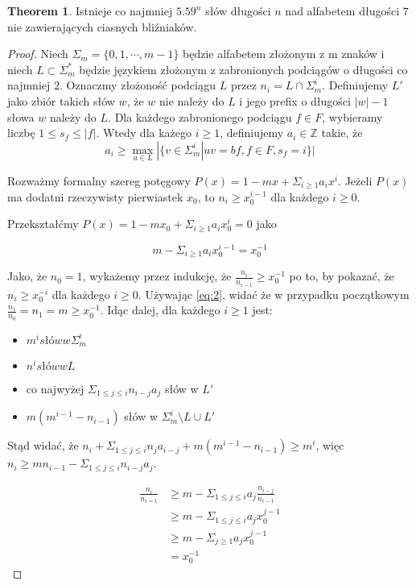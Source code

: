\documentclass[11pt,a4paper]{article}
\theoremstyle{definition}
\newtheorem{theorem}{Theorem}[section]
\begin{document}
\begin{theorem}
Istnieje co najmniej $5.59^n$ słów długości $n$ nad alfabetem długości $7$ nie zawierających ciasnych bliźniaków.
\begin{proof}
Niech $\Sigma_m=\{0,1,\cdots ,m-1\}$ będzie alfabetem złożonym z m znaków i niech $L \subset \Sigma^{*}_m$ będzie językiem złożonym z zabronionych podciągów o długości co najmniej 2. Oznaczmy złożoność podciągu $L$ przez $n_i = L \cap \Sigma^{i}_m$. Definiujemy $L'$ jako zbiór takich słów $w$, że $w$ nie należy do $L$ i jego prefix o długości $|w| - 1$ słowa $w$ należy do $L$. Dla każdego zabronionego podciągu $f \in F$, wybieramy liczbę $1 \leq s_f \leq |f|$. Wtedy dla każego $i \geq 1$, definiujemy $a_i \in \mathbb{Z}$ takie, że 
\begin{equation} \label{eq:1}
	a_i \geq \max_{u \in L}|\{v \in \Sigma^{i}_m | uv = bf, f \in F, s_f = i \}|
\end{equation}

Rozważmy formalny szereg potęgowy $P(x) = 1 - mx + \Sigma_{i\geq 1} a_i x^i$. Jeżeli $P(x)$ ma dodatni rzeczywisty pierwiastek $x_0$, to $n_i \geq x_0^{i-1}$ dla każdego $i\geq 0$.

Przekształćmy $P(x) = 1 - mx_0 + \Sigma_{i\geq 1} a_i x_0^i = 0$ jako

\begin{equation} \label{eq:2}
m - \Sigma_{i\geq 1} a_i x_0^{i-1} = x_0^{-1}
\end{equation}

Jako, że $n_0=1$, wykażemy przez indukcję, że $\frac{n_i}{n_{i-1}} \geq x_0^{-1}$ po to, by pokazać, że $n_i \geq x_0^{-i}$ dla każdego $i \geq 0$. Używając \autoref{eq:2}, widać że w przypadku początkowym $\frac{n_1}{n_0} = n_1 = m \geq x_0^{-1}$. Idąc dalej, dla każdego $i \geq 1$ jest:
\begin{itemize}
\item $m^i słów w \Sigma^{i}_m$
\item $n^i słów w L$
\item co najwyżej $\Sigma_{1\leq j\leq i} n_{i-j} a_j$ słów w $L'$
\item $m(m^{i-1} - n_{i-1})$ słów w $\Sigma^{i}_m \setminus {L \cup L'}$
\end{itemize}

Stąd widać, że $n_i + \Sigma_{1\leq j\leq i} n_j a_{i-j} + m(m^{i-1} - n_{i-1}) \geq m^i$, więc $n_i \geq mn_{i-1} - \Sigma_{1\leq j\leq i} n_{i-j} a_j$.

\begin{equation}
\begin{split}
\frac{n_i}{n_{i=1}} & \geq m - \Sigma_{1\leq j\leq i} a_{j} \frac{n_{i-j}}{n_{i-1}} \\
& \geq m - \Sigma_{1\leq j\leq i} a_{j} x_0^{j-1} \\
& \geq m - \Sigma_{j \geq 1} a_{j} x_0^{j-1} \\
& = x_0^{-1}
\end{split}
\end{equation}


\end{proof}
\end{theorem}
\end{document}
